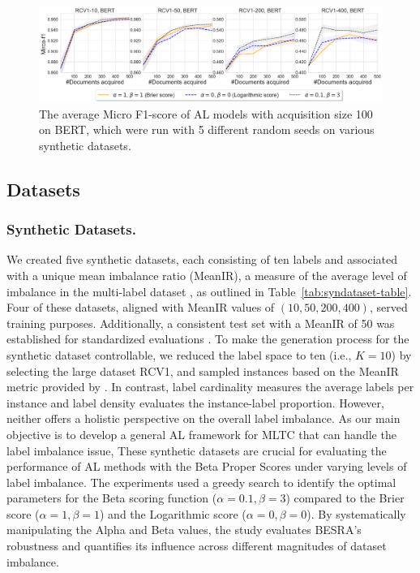 \documentclass[letterpaper]{article} %
\begin{document}
\begin{figure}[!t]
\centering
\includegraphics[width=1\textwidth]{figures/syn_rcv1meanIR50_mircof1.png}
\caption{The average Micro F1-score of AL models with acquisition size 100 on BERT, which were run with 5 different random seeds on various synthetic datasets.}
\label{fig:syn_rcv1meanIR50_mircof1}
\end{figure}

\subsection{Datasets}


\subsubsection{Synthetic Datasets.}
We created five synthetic datasets, each consisting of ten labels and associated with a unique mean imbalance ratio (MeanIR), a measure of the average level of imbalance in the multi-label dataset \cite{CHARTE20153}, as outlined in Table~\ref{tab:syndataset-table}.
Four of these datasets, aligned with MeanIR values of $(10, 50, 200, 400)$, served training purposes. Additionally, a consistent test set with a MeanIR of 50 was established for standardized evaluations \cite{wang2023imbalanced}.
To make the generation process for the synthetic dataset controllable,
we reduced the label space to ten (i.e., $K=10$) by selecting the large dataset RCV1, and sampled instances based on the MeanIR metric provided by \citet{CHARTE20153}.
In contrast, label cardinality measures the average labels per instance and label density evaluates the instance-label proportion. However, neither offers a holistic perspective on the overall label imbalance.
As our main objective is to develop a general AL framework for MLTC that can handle the label imbalance issue,
These synthetic datasets are crucial for evaluating the performance of AL methods with the Beta Proper Scores under varying levels of label imbalance.
The experiments used a greedy search to identify the optimal parameters for the Beta scoring function ($\alpha = 0.1, \beta = 3$) compared to the Brier score ($\alpha = 1, \beta = 1$) and the Logarithmic score ($\alpha = 0, \beta = 0$).
By systematically manipulating the Alpha and Beta values, the study evaluates BESRA's robustness and quantifies its influence across different magnitudes of dataset imbalance.
\end{document}
